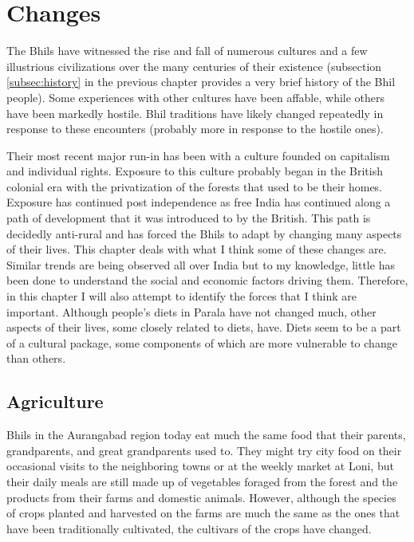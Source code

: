 \documentclass[report.tex]{subfiles}
\begin{document}
\chapter{Changes}\label{chp:changes}

The Bhils have witnessed the rise and fall of numerous cultures and a few illustrious civilizations over the many centuries of their existence (subsection \ref{subsec:history} in the previous chapter provides a very brief history of the Bhil people). Some experiences with other cultures have been affable, while others have been markedly hostile. Bhil traditions have likely changed repeatedly in response to these encounters (probably more in response to the hostile ones).

Their most recent major run-in has been with a culture founded on capitalism and individual rights. Exposure to this culture probably began in the British colonial era with the privatization of the forests that used to be their homes. Exposure has continued post independence as free India has continued along a path of development that it was introduced to by the British. This path is decidedly anti-rural and has forced the Bhils to adapt by changing many aspects of their lives. This chapter deals with what I think some of these changes are. Similar trends are being observed all over India but to my knowledge, little has been done to understand the social and economic factors driving them. Therefore, in this chapter I will also attempt to identify the forces that I think are important. Although people's diets in Parala have not changed much, other aspects of their lives, some closely related to diets, have. Diets seem to be a part of a cultural package, some components of which are more vulnerable to change than others.

\section{Agriculture}\label{sec:agriculture}

Bhils in the Aurangabad region today eat much the same food that their parents, grandparents, and great grandparents used to. They might try city food on their occasional visits to the neighboring towns or at the weekly market at Loni, but their daily meals are still made up of vegetables foraged from the forest and the products from their farms and domestic animals. However, although the species of crops planted and harvested on the farms are much the same as the ones that have been traditionally cultivated, the cultivars of the crops have changed.
\end{document}

